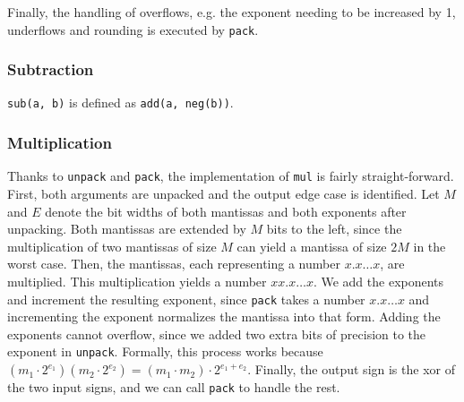 \documentclass[a4paper,UKenglish,cleveref, autoref, thm-restate]{lipics-v2019}
\begin{document}
Finally, the handling of overflows, e.g. the exponent needing to be increased by 1, underflows and rounding is executed by \verb|pack|.

\subsubsection{Subtraction}
\verb|sub(a, b)| is defined as \verb|add(a, neg(b))|.

\subsubsection{Multiplication}
Thanks to \verb|unpack| and \verb|pack|, the implementation of \verb|mul| is fairly straight-forward. First, both arguments are unpacked and the output edge case is identified. 
Let $M$ and $E$ denote the bit widths of both mantissas and both exponents after unpacking.
Both mantissas are extended by $M$ bits to the left, since the multiplication of two mantissas of size $M$ can yield a mantissa of size $2M$ in the worst case. Then, the mantissas, each representing a number $x.x\dots x$, are multiplied. This multiplication yields a number $xx.x\dots x$. We add the exponents and increment the resulting exponent, since \verb|pack| takes a number $x.x \dots x$ and incrementing the exponent normalizes the mantissa into that form. Adding the exponents cannot overflow, since we added two extra bits of precision to the exponent in \verb|unpack|. Formally, this process works because $(m_1 \cdot 2^{e_1})(m_2 \cdot 2^{e_2}) = (m_1 \cdot m_2) \cdot 2^{e_1 + e_2}$. Finally, the output sign is the xor of the two input signs, and we can call \verb|pack| to handle the rest.
\end{document}
